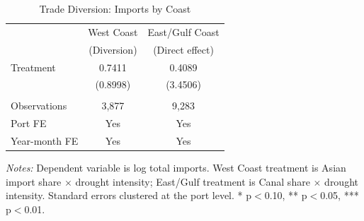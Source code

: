 \begin{table}[H]
\centering
\caption{Trade Diversion: Imports by Coast}
\label{tab:diversion}
\begin{threeparttable}
\begin{tabular}{lcc}
\toprule
& West Coast & East/Gulf Coast \\
& (Diversion) & (Direct effect) \\
\midrule
Treatment & 0.7411 & 0.4089 \\
& (0.8998) & (3.4506) \\
\\
Observations & 3,877 & 9,283 \\
Port FE & Yes & Yes \\
Year-month FE & Yes & Yes \\
\bottomrule
\end{tabular}
\begin{tablenotes}[flushleft]
\small
\item \textit{Notes:} Dependent variable is log total imports. West Coast treatment is Asian import share $\times$ drought intensity; East/Gulf treatment is Canal share $\times$ drought intensity. Standard errors clustered at the port level. * p$<$0.10, ** p$<$0.05, *** p$<$0.01.
\end{tablenotes}
\end{threeparttable}
\end{table}
